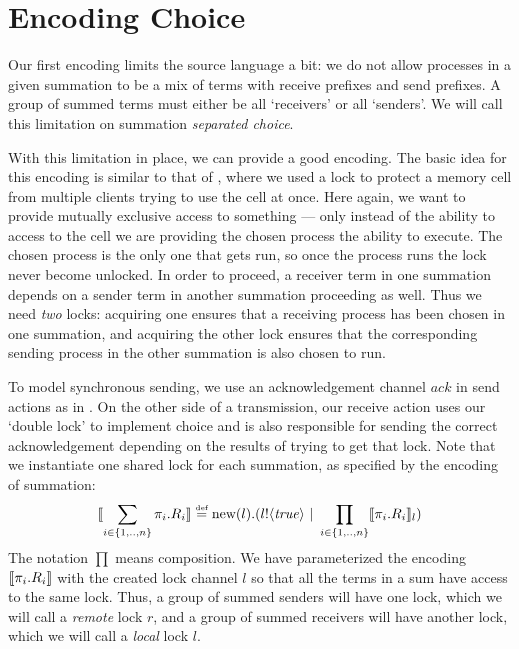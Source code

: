 \section{Encoding Choice}\label{failedencoding}
Our first encoding limits the source language a bit: we do not allow processes in a given summation to be a mix of terms with receive prefixes and send prefixes.  
A group of summed terms must either be all `receivers' or all `senders'.  
We will call this limitation on summation \emph{separated choice}.

With this limitation in place, we can provide a good encoding.  
The basic idea for this encoding is similar to that of , where we used a lock to protect a memory cell from multiple clients trying to use the cell at once.  
Here again, we want to provide mutually exclusive access to something --- only instead of the ability to access to the cell we are providing the chosen process the ability to execute.  
The chosen process is the only one that gets run, so once the process runs the lock never become unlocked.  
In order to proceed, a receiver term in one summation depends on a sender term in another summation proceeding as well.
Thus we need \emph{two} locks: acquiring one ensures that a receiving process has been chosen in one summation, and acquiring the other lock ensures that the corresponding sending process in the other summation is also chosen to run.

To model synchronous sending, we use an acknowledgement channel $ack$ in send actions as in .  On the other side of a transmission, our receive action uses our `double lock' to implement choice and is also responsible for sending the correct acknowledgement depending on the results of trying to get that lock.  Note that we instantiate one shared lock for each summation, as specified by the encoding of summation:
\[
	\llbracket{\displaystyle\sum_{i\in \{1,..,n\}} \pi_i.R_i}\rrbracket \overset{\mbox{\tiny{def}}}{=} \text{new}({l}).({l}!\langle{ \ensuremath{\text{\emph{true}}} }\rangle \ |\  \displaystyle\prod_{i\in \{1,..,n\}}\llbracket{\pi_i.R_i}\rrbracket_l)
\]
The notation $\prod$ means composition.  We have parameterized the encoding $\llbracket{\pi_i.R_i}\rrbracket$ with the created lock channel $l$ so that all the terms in a sum have access to the same lock.  Thus, a group of summed senders will have one lock, which we will call a \emph{remote} lock $r$, and a group of summed receivers will have another lock, which we will call a \emph{local} lock $l$.


